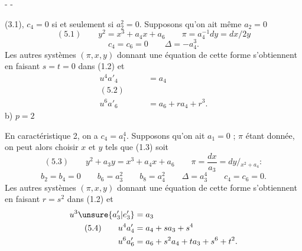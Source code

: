 -  -

(3.1), $c_4=0$ si et seulement si $a_2^2=0$. Supposons qu'on ait même $a_2=0$
\[
(5.1)\qquad y^2=x^3+a_4x+a_6\qquad\pi=a_4^{-1}dy=dx/2y
\]
\[
c_4=c_6=0\qquad\Delta=-a_4^3.
\]
Les autres systèmes $(\pi,x,y)$ donnant une équation de cette forme s'obtiennent en faisant $s=t=0$ dans (1.2) et
\[
\begin{aligned}
u^4a'_4&=a_4\\
(5.2)\qquad&\\
u^6a'_6&=a_6+ra_4+r^3.
\end{aligned}
\]
b) $p=2$

En caractéristique 2, on a $c_4=a_1^4$. Supposons qu'on ait $a_1=0$ ; $\pi$ étant donnée, on peut alors choisir $x$ et $y$ tels que (1.3) soit
\[
(5.3)\qquad y^2+a_3y=x^3+a_4x+a_6\qquad\pi=\frac{dx}{a_3}=dy/{}_{x^2+a_4}:
\]
\[
b_2=b_4=0\qquad b_6=a_3^2\qquad b_8=a_4^2\qquad\Delta=a_3^4\qquad c_4=c_6=0.
\]
Les autres systèmes $(\pi,x,y)$ donnant une équation de cette forme s'obtiennent en faisant $r=s^2$ dans (1.2) et
\[
\begin{aligned}
u^3\unsure{a'_3|e'_3}&=a_3\\
(5.4)\qquad u^4a'_4&=a_4+sa_3+s^4\\
u^6a'_6&=a_6+s^2a_4+ta_3+s^6+t^2.
\end{aligned}
\]
